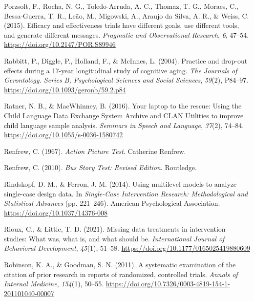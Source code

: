 \documentclass{krantz}
\newlength{\cslhangindent}
\newlength{\cslentryspacingunit} %
\newenvironment{CSLReferences}[2] %
{%
\setlength{\parindent}{0pt}
\ifodd #1
\let\oldpar\par
\def\par{\hangindent=\cslhangindent\oldpar}
\fi
\setlength{\parskip}{#2\cslentryspacingunit}
}%
{}
\begin{document}
\begin{CSLReferences}{1}{0}
\leavevmode{}%
Porzsolt, F., Rocha, N. G., Toledo-Arruda, A. C., Thomaz, T. G., Moraes, C., Bessa-Guerra, T. R., Leão, M., Migowski, A., Araujo da Silva, A. R., \& Weiss, C. (2015). Efficacy and effectiveness trials have different goals, use different tools, and generate different messages. \emph{Pragmatic and Observational Research}, \emph{6}, 47--54. \url{https://doi.org/10.2147/POR.S89946}

\leavevmode{}%
Rabbitt, P., Diggle, P., Holland, F., \& McInnes, L. (2004). Practice and drop-out effects during a 17-year longitudinal study of cognitive aging. \emph{The Journals of Gerontology. Series B, Psychological Sciences and Social Sciences}, \emph{59}(2), P84--97. \url{https://doi.org/10.1093/geronb/59.2.p84}

\leavevmode{}%
Ratner, N. B., \& MacWhinney, B. (2016). Your laptop to the rescue: {Using} the {Child Language Data Exchange System Archive} and {CLAN Utilities} to improve child language sample analysis. \emph{Seminars in Speech and Language}, \emph{37}(2), 74--84. \url{https://doi.org/10.1055/s-0036-1580742}

\leavevmode{}%
Renfrew, C. (1967). \emph{Action {Picture Test}}. {Catherine Renfrew}.

\leavevmode{}%
Renfrew, C. (2010). \emph{Bus {Story Test}: {Revised Edition}}. {Routledge}.

\leavevmode{}%
Rindskopf, D. M., \& Ferron, J. M. (2014). Using multilevel models to analyze single-case design data. In \emph{Single-{Case Intervention Research}: {Methodological} and {Statistical Advances}} (pp. 221--246). {American Psychological Association}. \url{https://doi.org/10.1037/14376-008}

\leavevmode{}%
Rioux, C., \& Little, T. D. (2021). Missing data treatments in intervention studies: {What} was, what is, and what should be. \emph{International Journal of Behavioral Development}, \emph{45}(1), 51--58. \url{https://doi.org/10.1177/0165025419880609}

\leavevmode{}%
Robinson, K. A., \& Goodman, S. N. (2011). A systematic examination of the citation of prior research in reports of randomized, controlled trials. \emph{Annals of Internal Medicine}, \emph{154}(1), 50--55. \url{https://doi.org/10.7326/0003-4819-154-1-201101040-00007}


\end{CSLReferences}
\end{document}
